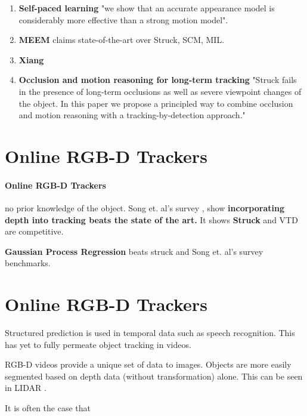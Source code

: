 \begin{enumerate}
\item \textbf{Self-paced learning} \cite{supancic2013self} "we show that an accurate appearance model is considerably more effective than a strong motion model". 
\item \textbf{MEEM} \cite{zhang2014meem} claims state-of-the-art over Struck, SCM, MIL.
\item \textbf{Xiang} \cite{xiang2014monocular}
\item \textbf{Occlusion and motion reasoning for long-term tracking} \cite{hua2014occlusion} "Struck fails in
the presence of long-term occlusions as well as severe viewpoint changes
of the object. In this paper we propose a principled way to combine occlusion and motion reasoning with a tracking-by-detection approach."
\end{enumerate}

\section{Online RGB-D Trackers}
\label{sec:relatedwork}
\paragraph{Online RGB-D Trackers} no prior knowledge of the object.
Song et. al's survey \cite{song2013tracking}, show \textbf{incorporating depth into tracking beats the state of the art.} It shows \textbf{Struck} \cite{hare2011struck} and VTD are competitive.

\textbf{Gaussian Process Regression} \cite{gao2014transfer} beats struck and Song et. al's survey benchmarks.

\section{Online RGB-D Trackers}
\label{sec:relatedwork}
Structured prediction is used in temporal data such as speech recognition. This
has yet to fully permeate object tracking in videos.

RGB-D videos provide a unique set of data to images. Objects are more easily
segmented based on depth data (without transformation) alone. This can be seen
in LIDAR \cite{morton2013multi}.

It is often the case that 
